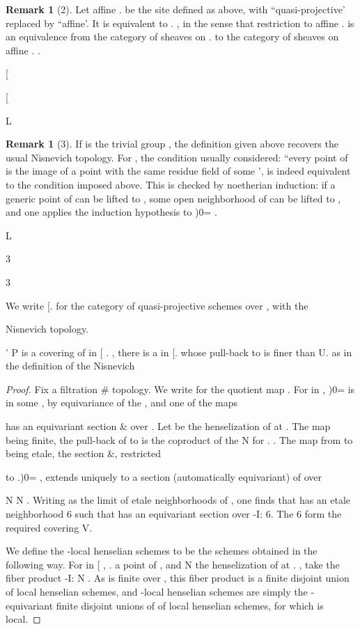 \documentclass[11pt,a4paper]{article}
\theoremstyle{plain}
\theoremstyle{definition}
\newtheorem{remark}[theorem]{Remark}
\begin{document}
\begin{remark}[2]
Let affine
.   be the site defined as above, with ``quasi-projective'
replaced by ``affine'. It is equivalent to
.   , in the sense that restriction to
affine
.   is an equivalence from the category of sheaves on
.   to the
category of sheaves on affine
. .



 



[ 

 

[ 

L

\end{remark}

\begin{remark}[3]
If is the trivial group , the definition given above recovers the usual
Nisnevich topology. For
, the condition usually considered: ``every point
of is the image of a point with the same residue field of some  ', is indeed
equivalent to the condition imposed above. This is checked by noetherian induction:
if a generic point of can be lifted to  , some open neighborhood  of
can be lifted to  , and one applies the induction hypothesis to 
 )0= .

 

L


3 

  3

  
We write [.   for the category of quasi-projective schemes over  , with the

Nisnevich topology.

  '  P is a covering of  in [ .   , there is a
 in [.   whose pull-back to  is finer than U.
 as in the definition of the Nisnevich
\end{remark}

\begin{proof} Fix a filtration \#       
topology. We write  for the quotient map 
 . For  in  ,  )0=
is in some     , by equivariance of the  , and one of the maps 

has an equivariant section \& over     . Let   be the henselization of
 at . The map  being finite, the pull-back of   to  is the coproduct of
the N for .
. The map from  to  being etale, the section \&, restricted


to  .)0= , extends uniquely to a section (automatically equivariant) of  over


N  N . Writing   as the limit of etale neighborhoods of  , one finds
that  has an etale neighborhood 6 such that  has an equivariant section over
 -I: 6. The 6 form the required covering V.

We define the -local henselian schemes to be the schemes  obtained in the
following way. For  in [ , . a point of  , and  N the henselization
of  at . , take the fiber product 
 -I:  N . As  is finite over  ,
this fiber product is a finite disjoint union of local henselian schemes, and -local
henselian schemes are simply the -equivariant finite disjoint unions of  of local
henselian schemes, for which  is local.
\end{proof}
\end{document}
